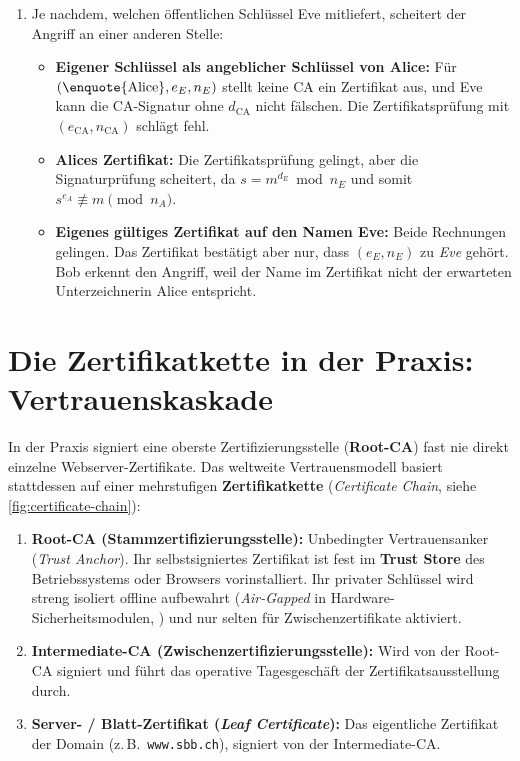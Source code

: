 \begin{myexercise}
\begin{myanswer}
\begin{enumerate}
\begin{enumerate}
			      \end{enumerate}
			\item Je nachdem, welchen öffentlichen Schlüssel Eve mitliefert, scheitert der Angriff an einer anderen Stelle:
			      \begin{itemize}
				      \item \textbf{Eigener Schlüssel als angeblicher Schlüssel von Alice:} Für $(\text{\enquote{Alice}},\allowbreak e_E,\allowbreak n_E)$ stellt keine \gls{CA} ein Zertifikat aus, und Eve kann die \gls{CA}-Signatur ohne $d_{\text{CA}}$ nicht fälschen. Die Zertifikatsprüfung mit $(e_{\text{CA}}, n_{\text{CA}})$ schlägt fehl.
				      \item \textbf{Alices Zertifikat:} Die Zertifikatsprüfung gelingt, aber die Signaturprüfung scheitert, da $s = m^{d_E} \bmod n_E$ und somit $s^{e_A} \not\equiv m \pmod{n_A}$.
				      \item \textbf{Eigenes gültiges Zertifikat auf den Namen Eve:} Beide Rechnungen gelingen. Das Zertifikat bestätigt aber nur, dass $(e_E, n_E)$ zu \emph{Eve} gehört. Bob erkennt den Angriff, weil der Name im Zertifikat nicht der erwarteten Unterzeichnerin Alice entspricht.
			      \end{itemize}
		\end{enumerate}
	\end{myanswer}
\end{myexercise}

\section{Die Zertifikatkette in der Praxis: Vertrauenskaskade}
In der Praxis signiert eine oberste Zertifizierungsstelle (\textbf{Root-\gls{CA}}) fast nie direkt einzelne Webserver-Zertifikate. Das weltweite Vertrauensmodell basiert stattdessen auf einer mehrstufigen \textbf{Zertifikatkette} (\emph{Certificate Chain}, siehe \cref{fig:certificate-chain}):

\begin{enumerate}
	\item \textbf{Root-\gls{CA} (Stammzertifizierungsstelle):} Unbedingter Vertrauensanker (\emph{Trust Anchor}). Ihr selbstsigniertes Zertifikat ist fest im \textbf{Trust Store} des Betriebssystems oder Browsers vorinstalliert. Ihr privater Schlüssel wird streng isoliert offline aufbewahrt (\emph{Air-Gapped} in Hardware-Sicherheitsmodulen, ) und nur selten für Zwischenzertifikate aktiviert.
	\item \textbf{Intermediate-\gls{CA} (Zwischenzertifizierungsstelle):} Wird von der Root-\gls{CA} signiert und führt das operative Tagesgeschäft der Zertifikatsausstellung durch.
	\item \textbf{Server- / Blatt-Zertifikat (\emph{Leaf Certificate}):} Das eigentliche Zertifikat der Domain (z.\,B.\ \texttt{www.sbb.ch}), signiert von der Intermediate-\gls{CA}.
\end{enumerate}

